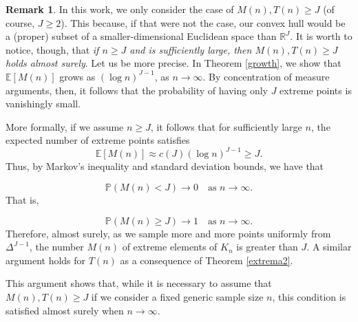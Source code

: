 \documentclass[12pt, reqno]{amsart}
\theoremstyle{definition}
\newtheorem{remark}{Remark}
\begin{document}

\begin{remark}
In this work, we only consider the case of $M(n),T(n)\geq J$ (of course, $J \geq 2$). This because, if that were not the case, our convex hull would be a (proper) subset of a smaller-dimensional Euclidean space than $\mathbb{R}^J$. 
It is worth to notice, though, that {\em if $n \geq J$ and is sufficiently large, then $M(n),T(n)\geq J$ holds almost surely}. Let us be more precise. In Theorem \ref{growth}, we show that $\mathbb{E}[M(n)]$ grows as $(\log n)^{J-1}$, as $n\rightarrow \infty$. By concentration of measure arguments, then, it follows that the probability of having only \( J \) extreme points is vanishingly small. 

More formally, if we assume \( n \geq J \), it follows that for sufficiently large \( n \), the expected number of extreme points satisfies
\[
\mathbb{E}[M(n)] \approx c(J) (\log n)^{J-1} \geq J.
\]
Thus, by Markov's inequality and standard deviation bounds, we have that

\[
\mathbb{P}(M(n) < J) \rightarrow 0 \quad \text{as } n \rightarrow \infty.
\]
That is,

\[
\mathbb{P}(M(n) \geq J) \rightarrow 1 \quad \text{as } n \rightarrow \infty.
\]
Therefore, almost surely, as we sample more and more points uniformly from $\Delta^{J-1}$, the number $M(n)$ of extreme elements of $K_n$ is greater than \( J \). A similar argument holds for $T(n)$ as a consequence of Theorem \ref{extrema2}. 

This argument shows that, while it is necessary to assume that $M(n),T(n) \geq J$ if we consider a fixed generic sample size $n$, this condition is satisfied almost surely when $n \rightarrow \infty$.
\end{remark}
\end{document}
